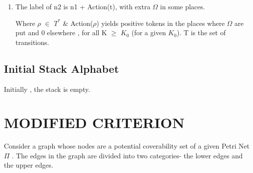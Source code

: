 \documentclass[a4paper,10pt]{article}
\begin{document}
\begin{enumerate}
\begin{center}
      \end{center} 
   
   
   
   
   
   
   
   
   
   
   
   
   
   
   \item
      The label of n2 is n1 + Action(t), with extra $\Omega$ in some places. 
      
      \begin{center}

      \end{center}
       Where $\rho$ $\in$ $T^{\ast}$ \& Action($\rho$) yields positive tokens in the 
       places where $\Omega$ are put and 0 elsewhere , \newline 
       for all K $\geq$ $K_{0}$ (for a given $K_{0}$).
       \newline
       T is the set of transitions. 
      
       \end{enumerate}
   
   
   \subsection{Initial Stack Alphabet}
    Initially , the stack is empty.    

\section{MODIFIED CRITERION}
    Consider a graph whose nodes are a potential coverability set of a given Petri Net $\Pi$ . The edges in the graph are divided into two categories- the lower edges and the upper edges.
    \begin{center}
     \end{center}
     
\end{document}

